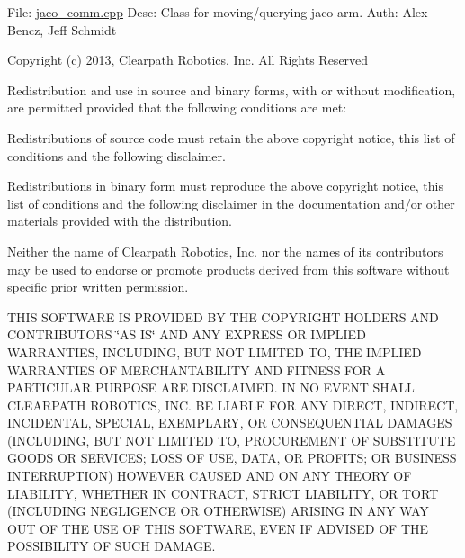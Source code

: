 File\+: \hyperlink{jaco__comm_8cpp}{jaco\+\_\+comm.\+cpp} Desc\+: Class for moving/querying jaco arm. Auth\+: Alex Bencz, Jeff Schmidt

Copyright (c) 2013, Clearpath Robotics, Inc. All Rights Reserved

Redistribution and use in source and binary forms, with or without modification, are permitted provided that the following conditions are met\+:
\begin{DoxyItemize}
\item Redistributions of source code must retain the above copyright notice, this list of conditions and the following disclaimer.
\item Redistributions in binary form must reproduce the above copyright notice, this list of conditions and the following disclaimer in the documentation and/or other materials provided with the distribution.
\item Neither the name of Clearpath Robotics, Inc. nor the names of its contributors may be used to endorse or promote products derived from this software without specific prior written permission.
\end{DoxyItemize}

T\+H\+IS S\+O\+F\+T\+W\+A\+RE IS P\+R\+O\+V\+I\+D\+ED BY T\+HE C\+O\+P\+Y\+R\+I\+G\+HT H\+O\+L\+D\+E\+RS A\+ND C\+O\+N\+T\+R\+I\+B\+U\+T\+O\+RS \char`\"{}\+A\+S I\+S\char`\"{} A\+ND A\+NY E\+X\+P\+R\+E\+SS OR I\+M\+P\+L\+I\+ED W\+A\+R\+R\+A\+N\+T\+I\+ES, I\+N\+C\+L\+U\+D\+I\+NG, B\+UT N\+OT L\+I\+M\+I\+T\+ED TO, T\+HE I\+M\+P\+L\+I\+ED W\+A\+R\+R\+A\+N\+T\+I\+ES OF M\+E\+R\+C\+H\+A\+N\+T\+A\+B\+I\+L\+I\+TY A\+ND F\+I\+T\+N\+E\+SS F\+OR A P\+A\+R\+T\+I\+C\+U\+L\+AR P\+U\+R\+P\+O\+SE A\+RE D\+I\+S\+C\+L\+A\+I\+M\+ED. IN NO E\+V\+E\+NT S\+H\+A\+LL C\+L\+E\+A\+R\+P\+A\+TH R\+O\+B\+O\+T\+I\+CS, I\+NC. BE L\+I\+A\+B\+LE F\+OR A\+NY D\+I\+R\+E\+CT, I\+N\+D\+I\+R\+E\+CT, I\+N\+C\+I\+D\+E\+N\+T\+AL, S\+P\+E\+C\+I\+AL, E\+X\+E\+M\+P\+L\+A\+RY, OR C\+O\+N\+S\+E\+Q\+U\+E\+N\+T\+I\+AL D\+A\+M\+A\+G\+ES (I\+N\+C\+L\+U\+D\+I\+NG, B\+UT N\+OT L\+I\+M\+I\+T\+ED TO, P\+R\+O\+C\+U\+R\+E\+M\+E\+NT OF S\+U\+B\+S\+T\+I\+T\+U\+TE G\+O\+O\+DS OR S\+E\+R\+V\+I\+C\+ES; L\+O\+SS OF U\+SE, D\+A\+TA, OR P\+R\+O\+F\+I\+TS; OR B\+U\+S\+I\+N\+E\+SS I\+N\+T\+E\+R\+R\+U\+P\+T\+I\+ON) H\+O\+W\+E\+V\+ER C\+A\+U\+S\+ED A\+ND ON A\+NY T\+H\+E\+O\+RY OF L\+I\+A\+B\+I\+L\+I\+TY, W\+H\+E\+T\+H\+ER IN C\+O\+N\+T\+R\+A\+CT, S\+T\+R\+I\+CT L\+I\+A\+B\+I\+L\+I\+TY, OR T\+O\+RT (I\+N\+C\+L\+U\+D\+I\+NG N\+E\+G\+L\+I\+G\+E\+N\+CE OR O\+T\+H\+E\+R\+W\+I\+SE) A\+R\+I\+S\+I\+NG IN A\+NY W\+AY O\+UT OF T\+HE U\+SE OF T\+H\+IS S\+O\+F\+T\+W\+A\+RE, E\+V\+EN IF A\+D\+V\+I\+S\+ED OF T\+HE P\+O\+S\+S\+I\+B\+I\+L\+I\+TY OF S\+U\+CH D\+A\+M\+A\+GE.

